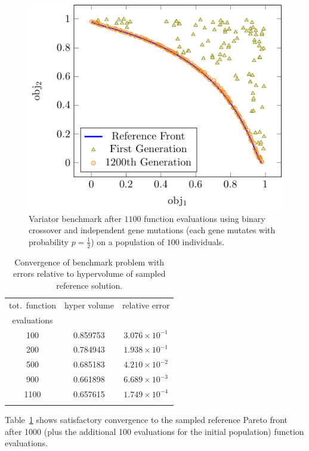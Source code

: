 \begin{figure}
  \centering
    \includegraphics[width=0.7\linewidth]{figures/valid_front}
  \caption{Variator benchmark after $1100$ function evaluations using binary
           crossover and independent gene mutations (each gene mutates with
           probability $p=\frac{1}{2}$) on a population of $100$
           individuals.}
  \label{fig:pisa_bench}
\end{figure}

\begin{table}%
\begin{center}
  \caption{Convergence of benchmark problem with errors relative to
    hypervolume of sampled reference solution.}
  \label{tbl:bench_rms_error}
  \begin{tabular}{c|c|c}
    \hline\noalign{\smallskip}
    tot.\ function  & hyper volume & relative error\\
    evaluations    & & \\
    \noalign{\smallskip}\hline\noalign{\smallskip}
    100  &  0.859753 & $3.076 \times 10^{-1}$ \\
    200  &  0.784943 & $1.938 \times 10^{-1}$ \\
    500  &  0.685183 & $4.210 \times 10^{-2}$ \\
    900  &  0.661898 & $6.689 \times 10^{-3}$ \\
    1100 &  0.657615 & $1.749 \times 10^{-4}$ \\
    \noalign{\smallskip}\hline
  \end{tabular}
\end{center}
\end{table}

Table~\ref{tbl:bench_rms_error} shows satisfactory
  convergence to the sampled reference Pareto front after 1000 (plus the
  additional 100 evaluations for the initial population) function evaluations.



